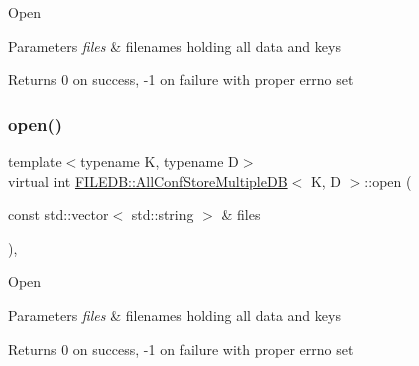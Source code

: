 Open 
\begin{DoxyParams}{Parameters}
{\em files} & filenames holding all data and keys\\
\hline
\end{DoxyParams}
\begin{DoxyReturn}{Returns}
0 on success, -\/1 on failure with proper errno set 
\end{DoxyReturn}
\mbox{\label{classFILEDB_1_1AllConfStoreMultipleDB_aa006283e8d6f0f079ca234c369f53679}} 
\subsubsection{\texorpdfstring{open()}{open()}\hspace{0.1cm}{\footnotesize\ttfamily [2/3]}}
{\footnotesize\ttfamily template$<$typename K, typename D$>$ \\
virtual int \mbox{\hyperlink{classFILEDB_1_1AllConfStoreMultipleDB}{F\+I\+L\+E\+D\+B\+::\+All\+Conf\+Store\+Multiple\+DB}}$<$ K, D $>$\+::open (\begin{DoxyParamCaption}\item[{const std\+::vector$<$ std\+::string $>$ \&}]{files }\end{DoxyParamCaption})\hspace{0.3cm}{\ttfamily [inline]}, {\ttfamily [virtual]}}

Open 
\begin{DoxyParams}{Parameters}
{\em files} & filenames holding all data and keys\\
\hline
\end{DoxyParams}
\begin{DoxyReturn}{Returns}
0 on success, -\/1 on failure with proper errno set 
\end{DoxyReturn}
\mbox{\label{classFILEDB_1_1AllConfStoreMultipleDB_aa006283e8d6f0f079ca234c369f53679}} 
